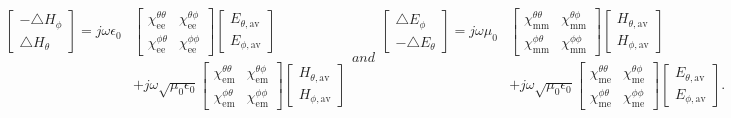 \documentclass[journal,transaction]{IEEEtran}
\begin{document}
\begin{subequations}\label{Eq:GSTC_EH}
\begin{equation}\label{Eq:GSTC_expanded_h}
\begin{split}
     \begin{bmatrix}
   -\triangle H_\phi  \\
   \triangle H_\theta
  \end{bmatrix}=j\omega\epsilon_0 &\begin{bmatrix}
 \chi^{\theta\theta}_\text{ee}&\chi^{\theta\phi}_\text{ee}\\
 \chi^{\phi \theta}_\text{ee}&\chi^{\phi \phi}_\text{ee}
  \end{bmatrix}\begin{bmatrix}
   E_{\theta,\text{av}} \\
   E_{\phi,\text{av}}
  \end{bmatrix}\\
  &+j\omega \sqrt{\mu_0 \epsilon_0} \begin{bmatrix}
\chi^{\theta \theta}_\text{em}&\chi^{\theta \phi}_\text{em}\\
 \chi^{\phi \theta}_\text{em}&\chi^{\phi \phi}_\text{em}
  \end{bmatrix} \begin{bmatrix}
                  H_{\theta,\text{av}} \\
                  H_{\phi,\text{av}}
                \end{bmatrix}
\end{split}
\end{equation}
and
\begin{equation}\label{Eq:GSTC_expanded_e}
\begin{split}
     \begin{bmatrix}
   \triangle E_\phi  \\
   -\triangle E_\theta
  \end{bmatrix}=j\omega\mu_0 &\begin{bmatrix}
\chi^{\theta \theta}_\text{mm}&\chi^{\theta \phi}_\text{mm}\\
\chi^{\phi \theta}_\text{mm}&\chi^{\phi \phi}_\text{mm}
  \end{bmatrix}\begin{bmatrix}
   H_{\theta,\text{av}}  \\
   H_{\phi,\text{av}}
  \end{bmatrix}\\
  &+j\omega \sqrt{\mu_0 \epsilon_0} \begin{bmatrix}
\chi^{\theta \theta}_\text{me}&\chi^{\theta\phi}_\text{me}\\
 \chi^{\phi \theta}_\text{me}&\chi^{\phi \phi}_\text{me}
  \end{bmatrix} \begin{bmatrix}
                  E_{\theta,\text{av}} \\
                  E_{\phi,\text{av}}
                \end{bmatrix}.
\end{split}
\end{equation}
\end{subequations}
\end{document}
